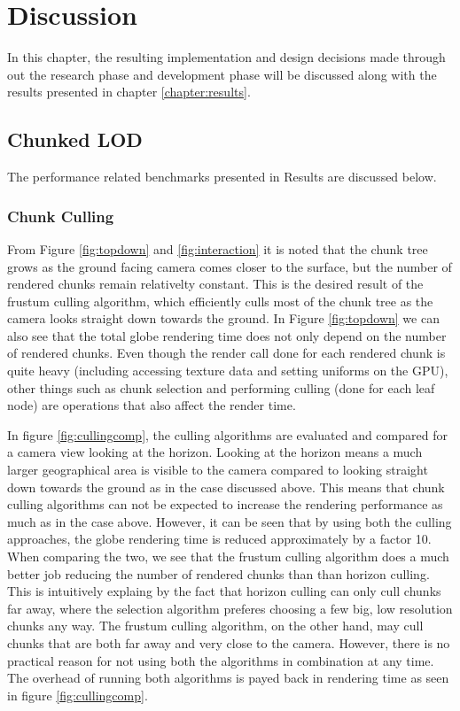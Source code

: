 \chapter{Discussion}
In this chapter, the resulting implementation and design decisions made through out the research phase and development phase will be discussed along with the results presented in chapter \ref{chapter:results}.

\section{Chunked LOD}
The performance related benchmarks presented in Results are discussed below.

\subsection{Chunk Culling}
From Figure \ref{fig:topdown} and \ref{fig:interaction} it is noted that the chunk tree grows as the ground facing camera comes closer to the surface, but the number of rendered chunks remain relativelty constant. This is the desired result of the frustum culling algorithm, which efficiently culls most of the chunk tree as the camera looks straight down towards the ground. In Figure \ref{fig:topdown} we can also see that the total globe rendering time does not only depend on the number of rendered chunks. Even though the render call done for each rendered chunk is quite heavy (including accessing texture data and setting uniforms on the GPU), other things such as chunk selection and performing culling (done for each leaf node) are operations that also affect the render time. 

In figure \ref{fig:cullingcomp}, the culling algorithms are evaluated and compared for a camera view looking at the horizon. Looking at the horizon means a much larger geographical area is visible to the camera compared to looking straight down towards the ground as in the case discussed above. This means that chunk culling algorithms can not be expected to increase the rendering performance as much as in the case above. However, it can be seen that by using both the culling approaches, the globe rendering time is reduced approximately by a factor 10. When comparing the two, we see that the frustum culling algorithm does a much better job reducing the number of rendered chunks than than horizon culling. This is intuitively explaing by the fact that horizon culling can only cull chunks far away, where the selection algorithm preferes choosing a few big, low resolution chunks any way. The frustum culling algorithm, on the other hand, may cull chunks that are both far away and very close to the camera. However, there is no practical reason for not using both the algorithms in combination at any time. The overhead of running both algorithms is payed back in rendering time as seen in figure \ref{fig:cullingcomp}.

